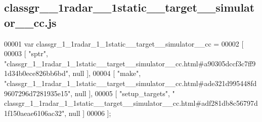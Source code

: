 \subsection{classgr\+\_\+\_\+1radar\+\_\+\_\+1static\+\_\+\+\_\+target\+\_\+\+\_\+simulator\+\_\+\+\_\+cc.\+js}
\label{classgr__1__1radar__1__1static____target____simulator____cc_8js_source}

\begin{DoxyCode}
00001 var classgr_1_1radar_1_1static__target__simulator__cc =
00002 [
00003     [ \textcolor{stringliteral}{"sptr"}, \textcolor{stringliteral}{"classgr\_1\_1radar\_1\_1static\_\_target\_\_simulator\_\_cc.html#a90305dccf3c7ff91d34b0ece826bb6bd"}, 
      null ],
00004     [ \textcolor{stringliteral}{"make"}, \textcolor{stringliteral}{"classgr\_1\_1radar\_1\_1static\_\_target\_\_simulator\_\_cc.html#ade321d995448fd9607296d7281935e15"}, 
      null ],
00005     [ \textcolor{stringliteral}{"setup\_targets"}, \textcolor{stringliteral}{"
      classgr\_1\_1radar\_1\_1static\_\_target\_\_simulator\_\_cc.html#adf281db8c56797d1f150aeae6106ac32"}, null ]
00006 ];
\end{DoxyCode}
